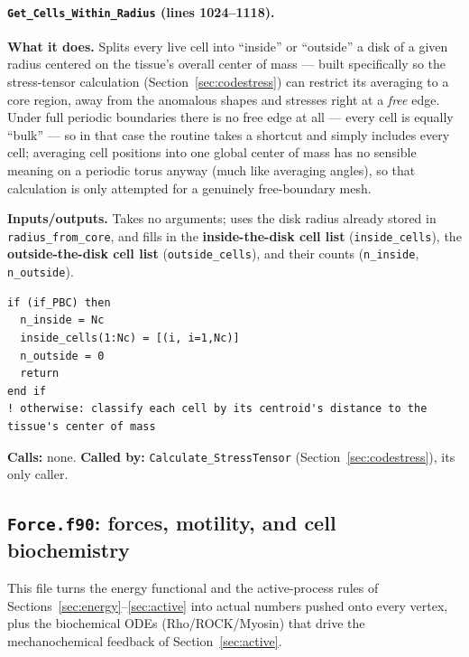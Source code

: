 \documentclass[11pt]{article}
\begin{document}
\paragraph{\texttt{Get\_Cells\_Within\_Radius} (lines 1024--1118).}
\textbf{What it does.} Splits every live cell into ``inside'' or ``outside'' a disk of
a given radius centered on the tissue's overall center of mass --- built specifically
so the stress-tensor calculation (Section~\ref{sec:codestress}) can restrict its
averaging to a core region, away from the anomalous shapes and stresses right at a
\emph{free} edge. Under full periodic boundaries there is no free edge at all --- every
cell is equally ``bulk'' --- so in that case the routine takes a shortcut and simply
includes every cell; averaging cell positions into one global center of mass has no
sensible meaning on a periodic torus anyway (much like averaging angles), so that
calculation is only attempted for a genuinely free-boundary mesh.

\textbf{Inputs/outputs.} Takes no arguments; uses the disk radius already stored in
\texttt{radius\_from\_core}, and fills in the \textbf{inside-the-disk cell list}
(\texttt{inside\_cells}), the \textbf{outside-the-disk cell list}
(\texttt{outside\_cells}), and their counts (\texttt{n\_inside}, \texttt{n\_outside}).

\begin{lstlisting}[caption={The periodic-boundary shortcut in \texttt{Get\_Cells\_Within\_Radius}: every cell counts as bulk.}]
if (if_PBC) then
  n_inside = Nc
  inside_cells(1:Nc) = [(i, i=1,Nc)]
  n_outside = 0
  return
end if
! otherwise: classify each cell by its centroid's distance to the tissue's center of mass
\end{lstlisting}

\textbf{Calls:} none. \textbf{Called by:} \texttt{Calculate\_StressTensor}
(Section~\ref{sec:codestress}), its only caller.
\subsection{\texttt{Force.f90}: forces, motility, and cell biochemistry}
\label{sec:codeforce}

This file turns the energy functional and the active-process rules of
Sections~\ref{sec:energy}--\ref{sec:active} into actual numbers pushed onto every
vertex, plus the biochemical ODEs (Rho/ROCK/Myosin) that drive the mechanochemical
feedback of Section~\ref{sec:active}.
\end{document}
